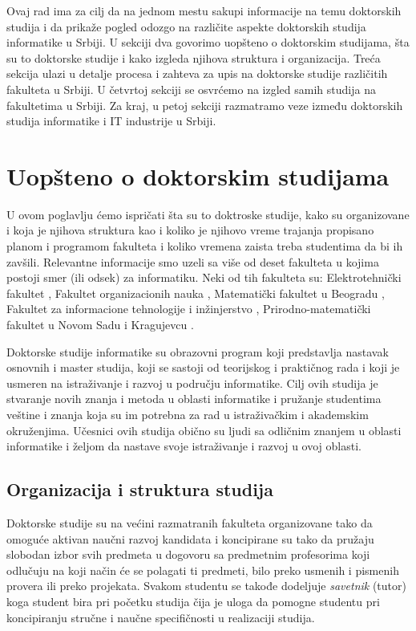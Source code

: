 \documentclass[a4paper]{article}
\begin{document}
Ovaj rad ima za cilj da na jednom mestu sakupi informacije na temu doktorskih studija i da prikaže pogled odozgo na različite aspekte doktorskih studija informatike u Srbiji. U sekciji dva govorimo uopšteno o doktorskim studijama, šta su to doktorske studije i kako izgleda njihova struktura i organizacija. Treća sekcija ulazi u detalje procesa i zahteva za upis na doktorske studije različitih fakulteta u Srbiji. U četvrtoj sekciji se osvrćemo na izgled samih studija na fakultetima u Srbiji. Za kraj, u petoj sekciji razmatramo veze između doktorskih studija informatike i IT industrije u Srbiji.

\section{Uopšteno o doktorskim studijama}
\label{sec:uopsteno}

U ovom poglavlju ćemo ispričati šta su to doktroske studije, kako su organizovane i koja je njihova struktura kao i koliko je njihovo vreme trajanja propisano planom i programom fakulteta i koliko vremena zaista treba studentima da bi ih zavšili. Relevantne informacije smo uzeli sa više od deset fakulteta u kojima postoji smer (ili odsek) za informatiku. Neki od tih fakulteta su: Elektrotehnički fakultet \cite{etfdoktorske}, Fakultet organizacionih nauka \cite{fondoktorske}, Matematički fakultet u Beogradu \cite{matfbgdoktorske}, Fakultet za informacione tehnologije i inžinjerstvo \cite{ftndoktorske}, Prirodno-matematički fakultet u Novom Sadu \cite{matfnsdoktorske} i Kragujevcu \cite{matfkgdoktorske}.

Doktorske studije informatike su obrazovni program koji predstavlja nastavak osnovnih i master studija, koji se sastoji od teorijskog i praktičnog rada i koji je usmeren na istraživanje i razvoj u području informatike. Cilj ovih studija je stvaranje novih znanja i metoda u oblasti informatike i pružanje studentima veštine i znanja koja su im potrebna za rad u istraživačkim i akademskim okruženjima. Učesnici ovih studija obično su ljudi sa odličnim znanjem u oblasti informatike i željom da nastave svoje istraživanje i razvoj u ovoj oblasti.




\subsection{Organizacija i struktura studija}

Doktorske studije su na većini razmatranih fakulteta organizovane tako da omoguće aktivan naučni razvoj kandidata i koncipirane su tako da pružaju slobodan izbor svih predmeta u dogovoru sa predmetnim profesorima koji odlučuju na koji način će se polagati ti predmeti, bilo preko usmenih i pismenih provera ili preko projekata. Svakom studentu se takođe dodeljuje \emph{savetnik} (tutor) koga student bira pri početku studija čija je uloga da pomogne studentu pri koncipiranju stručne i naučne specifičnosti u realizaciji studija. 
\end{document}

